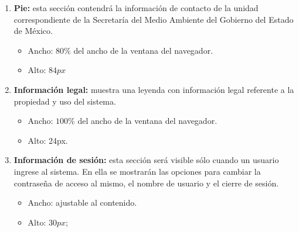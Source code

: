 \begin{enumerate}
        \item {\bf Pie:} esta sección contendrá la información de contacto de la unidad correspondiente de la Secretaría del Medio Ambiente del Gobierno del Estado de México.
        \begin{itemize}
            \item Ancho: $80\%$ del ancho de la ventana del navegador.
            \item Alto: $84px$
        \end{itemize}
        
        \item {\bf Información legal:} muestra una leyenda con información legal referente a la propiedad y uso del sistema.
        \begin{itemize}
            \item Ancho: $100\%$ del ancho de la ventana del navegador.
            \item Alto: 24px.
        \end{itemize}
        
        \item {\bf Información de sesión:} esta sección será visible sólo cuando un usuario ingrese al sistema. En ella se mostrarán las opciones para cambiar la contraseña de acceso al mismo, el nombre de usuario y el cierre de sesión.
        \begin{itemize}
            \item Ancho: ajustable al contenido.
            \item Alto: $30px$;
        \end{itemize}
    \end{enumerate}

  




  
